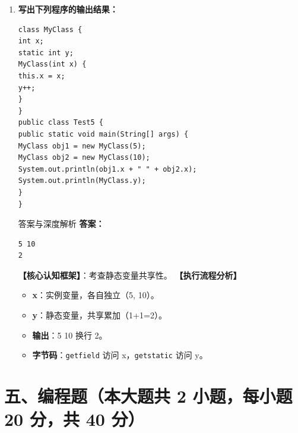\documentclass[12pt, a4paper]{ctexart}
\newcommand{\code}[1]{\texttt{\color{myblue}#1}}
\begin{document}
\begin{enumerate}[label=\arabic*.]
\item \textbf{写出下列程序的输出结果：}
\begin{lstlisting}
class MyClass {
int x;
static int y;
MyClass(int x) {
this.x = x;
y++;
}
}
public class Test5 {
public static void main(String[] args) {
MyClass obj1 = new MyClass(5);
MyClass obj2 = new MyClass(10);
System.out.println(obj1.x + " " + obj2.x);
System.out.println(MyClass.y);
}
}
\end{lstlisting}
\begin{bluebox}{答案与深度解析}
\textbf{答案：}
\begin{lstlisting}
5 10
2
\end{lstlisting}
\textbf{【核心认知框架】}：考查静态变量共享性。
\textbf{【执行流程分析】}
\begin{itemize}[leftmargin=*, nosep]
    \item \textbf{x}：实例变量，各自独立（5, 10）。
    \item \textbf{y}：静态变量，共享累加（1+1=2）。
    \item \textbf{输出}：5 10 换行 2。
    \item \textbf{字节码}：\code{getfield} 访问 x，\code{getstatic} 访问 y。
\end{itemize}
\end{bluebox}
\end{enumerate}

\section*{五、编程题（本大题共 2 小题，每小题 20 分，共 40 分）}
\end{document}
